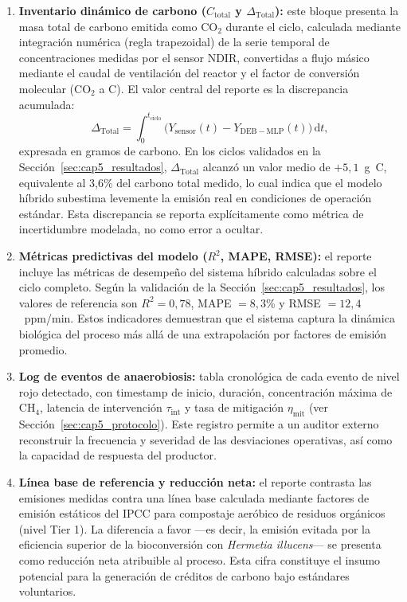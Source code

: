 \begin{enumerate}
    \item \textbf{Inventario dinámico de carbono ($C_{\mathrm{total}}$ y $\Delta_{\mathrm{Total}}$):} este bloque presenta la masa total de carbono emitida como CO$_2$ durante el ciclo, calculada mediante integración numérica (regla trapezoidal) de la serie temporal de concentraciones medidas por el sensor NDIR, convertidas a flujo másico mediante el caudal de ventilación del reactor y el factor de conversión molecular (CO$_2$ a C). El valor central del reporte es la discrepancia acumulada:
    \begin{equation}
    \Delta_{\mathrm{Total}} = \int_{0}^{t_{\mathrm{ciclo}}} \bigl(Y_{\mathrm{sensor}}(t) - Y_{\mathrm{DEB-MLP}}(t)\bigr)\,\mathrm{d}t,
    \label{eq:discrepancia_reporte}
    \end{equation}
    expresada en gramos de carbono. En los ciclos validados en la Sección~\ref{sec:cap5_resultados}, $\Delta_{\mathrm{Total}}$ alcanzó un valor medio de $+5{,}1$~g~C, equivalente al 3,6\% del carbono total medido, lo cual indica que el modelo híbrido subestima levemente la emisión real en condiciones de operación estándar. Esta discrepancia se reporta explícitamente como métrica de incertidumbre modelada, no como error a ocultar.
    
    \item \textbf{Métricas predictivas del modelo ($R^2$, MAPE, RMSE):} el reporte incluye las métricas de desempeño del sistema híbrido calculadas sobre el ciclo completo. Según la validación de la Sección~\ref{sec:cap5_resultados}, los valores de referencia son $R^2 = 0{,}78$, MAPE $= 8{,}3$\% y RMSE $= 12{,}4$~ppm/min. Estos indicadores demuestran que el sistema captura la dinámica biológica del proceso más allá de una extrapolación por factores de emisión promedio.
    
    \item \textbf{Log de eventos de anaerobiosis:} tabla cronológica de cada evento de nivel rojo detectado, con timestamp de inicio, duración, concentración máxima de CH$_4$, latencia de intervención $\tau_{\mathrm{int}}$ y tasa de mitigación $\eta_{\mathrm{mit}}$ (ver Sección~\ref{sec:cap5_protocolo}). Este registro permite a un auditor externo reconstruir la frecuencia y severidad de las desviaciones operativas, así como la capacidad de respuesta del productor.
    
    \item \textbf{Línea base de referencia y reducción neta:} el reporte contrasta las emisiones medidas contra una línea base calculada mediante factores de emisión estáticos del IPCC para compostaje aeróbico de residuos orgánicos (nivel Tier 1). La diferencia a favor ---es decir, la emisión evitada por la eficiencia superior de la bioconversión con \emph{Hermetia illucens}--- se presenta como reducción neta atribuible al proceso. Esta cifra constituye el insumo potencial para la generación de créditos de carbono bajo estándares voluntarios.
    

\end{enumerate}
